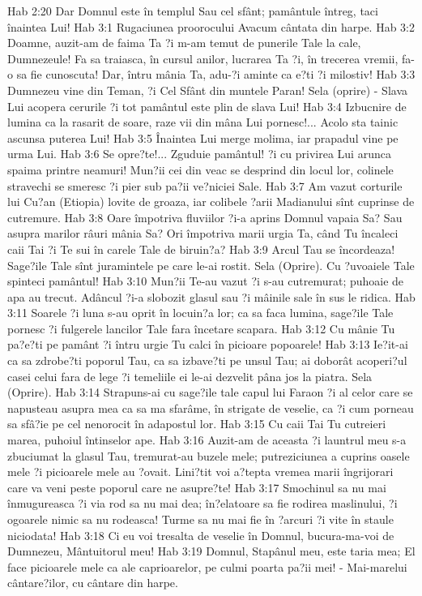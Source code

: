 Hab 2:20  Dar Domnul este în templul Sau cel sfânt; pamântule întreg, taci înaintea Lui!
Hab 3:1  Rugaciunea proorocului Avacum cântata din harpe.
Hab 3:2  Doamne, auzit-am de faima Ta ?i m-am temut de punerile Tale la cale, Dumnezeule! Fa sa traiasca, în cursul anilor, lucrarea Ta ?i, în trecerea vremii, fa-o sa fie cunoscuta! Dar, întru mânia Ta, adu-?i aminte ca e?ti ?i milostiv!
Hab 3:3  Dumnezeu vine din Teman, ?i Cel Sfânt din muntele Paran! Sela (oprire) - Slava Lui acopera cerurile ?i tot pamântul este plin de slava Lui!
Hab 3:4  Izbucnire de lumina ca la rasarit de soare, raze vii din mâna Lui pornesc!... Acolo sta tainic ascunsa puterea Lui!
Hab 3:5  Înaintea Lui merge molima, iar prapadul vine pe urma Lui.
Hab 3:6  Se opre?te!... Zguduie pamântul! ?i cu privirea Lui arunca spaima printre neamuri! Mun?ii cei din veac se desprind din locul lor, colinele stravechi se smeresc ?i pier sub pa?ii ve?niciei Sale.
Hab 3:7  Am vazut corturile lui Cu?an (Etiopia) lovite de groaza, iar colibele ?arii Madianului sînt cuprinse de cutremure.
Hab 3:8  Oare împotriva fluviilor ?i-a aprins Domnul vapaia Sa? Sau asupra marilor râuri mânia Sa? Ori împotriva marii urgia Ta, când Tu încaleci caii Tai ?i Te sui în carele Tale de biruin?a?
Hab 3:9  Arcul Tau se încordeaza! Sage?ile Tale sînt juramintele pe care le-ai rostit. Sela (Oprire). Cu ?uvoaiele Tale spinteci pamântul!
Hab 3:10  Mun?ii Te-au vazut ?i s-au cutremurat; puhoaie de apa au trecut. Adâncul ?i-a slobozit glasul sau ?i mâinile sale în sus le ridica.
Hab 3:11  Soarele ?i luna s-au oprit în locuin?a lor; ca sa faca lumina, sage?ile Tale pornesc ?i fulgerele lancilor Tale fara încetare scapara.
Hab 3:12  Cu mânie Tu pa?e?ti pe pamânt ?i întru urgie Tu calci în picioare popoarele!
Hab 3:13  Ie?it-ai ca sa zdrobe?ti poporul Tau, ca sa izbave?ti pe unsul Tau; ai doborât acoperi?ul casei celui fara de lege ?i temeliile ei le-ai dezvelit pâna jos la piatra. Sela (Oprire).
Hab 3:14  Strapuns-ai cu sage?ile tale capul lui Faraon ?i al celor care se napusteau asupra mea ca sa ma sfarâme, în strigate de veselie, ca ?i cum porneau sa sfâ?ie pe cel nenorocit în adapostul lor.
Hab 3:15  Cu caii Tai Tu cutreieri marea, puhoiul întinselor ape.
Hab 3:16  Auzit-am de aceasta ?i launtrul meu s-a zbuciumat la glasul Tau, tremurat-au buzele mele; putreziciunea a cuprins oasele mele ?i picioarele mele au ?ovait. Lini?tit voi a?tepta vremea marii îngrijorari care va veni peste poporul care ne asupre?te!
Hab 3:17  Smochinul sa nu mai înmugureasca ?i via rod sa nu mai dea; în?elatoare sa fie rodirea maslinului, ?i ogoarele nimic sa nu rodeasca! Turme sa nu mai fie în ?arcuri ?i vite în staule niciodata!
Hab 3:18  Ci eu voi tresalta de veselie în Domnul, bucura-ma-voi de Dumnezeu, Mântuitorul meu!
Hab 3:19  Domnul, Stapânul meu, este taria mea; El face picioarele mele ca ale caprioarelor, pe culmi poarta pa?ii mei! - Mai-marelui cântare?ilor, cu cântare din harpe.


